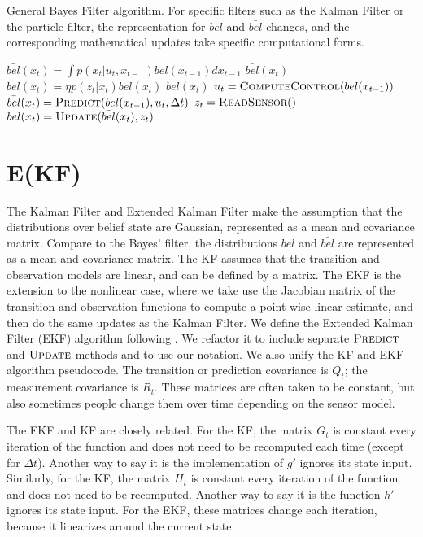 \documentclass{article}
\begin{document}
\begin{algorithm}
  \caption{General Bayes Filter algorithm.  For specific filters such as the Kalman Filter or the particle filter, the representation for $bel$ and $\bar{bel}$ changes, and the corresponding mathematical updates take specific computational forms.}
  \begin{algorithmic}[1]
    \State $\bar{bel}(x_t) = \int p(x_t | u_t, x_{t-1}) bel(x_{t-1}) dx_{t-1}$
    \State \Return $\bar{bel}(x_t)$
    \EndFunction
    \State $bel(x_t) = \eta p(z_t | x_t) bel(x_t)$
    \State \Return $bel(x_t)$    
    \EndFunction
    \State $u_t = \textsc{ComputeControl}(bel(x_{t-1}))$
    \State $\bar{bel}(x_t) = \textsc{Predict}(bel(x_{t-1}), u_t, \Delta t)$
    \State $z_t = \textsc{ReadSensor}()$
    \State $bel(x_t) = \textsc{Update}(\bar{bel}(x_t), z_t)$
    \EndFunction        
    \end{algorithmic}
\end{algorithm}


\section{E(KF)}

The Kalman Filter and Extended Kalman Filter make the assumption that
the distributions over belief state are Gaussian, represented as a
mean and covariance matrix. Compare to the Bayes' filter, the
distributions $bel$ and $\bar{bel}$ are represented as a mean and
covariance matrix.  The KF assumes that the transition and observation
models are linear, and can be defined by a matrix.  The EKF is the
extension to the nonlinear case, where we take use the Jacobian matrix
of the transition and observation functions to compute a point-wise
linear estimate, and then do the same updates as the Kalman Filter.
We define the Extended Kalman Filter (EKF) algorithm following
\citet{thrun2005probabilistic}.  We refactor it to include separate
$\textsc{Predict}$ and $\textsc{Update}$ methods and to use our
notation. We also unify the KF and EKF algorithm pseudocode.  The
transition or prediction covariance is $Q_t$; the measurement
covariance is $R_t$.  These matrices are often taken to be constant,
but also sometimes people change them over time depending on the
sensor model.

The EKF and KF are closely related.  For the KF, the matrix $G_t$ is
constant every iteration of the function and does not need to be
recomputed each time (except for $\Delta t$).  Another way to say it
is the implementation of $g'$ ignores its state input.  Similarly, for
the KF, the matrix $H_t$ is constant every iteration of the function
and does not need to be recomputed.  Another way to say it is the
function $h'$ ignores its state input.  For the EKF, these matrices
change each iteration, because it linearizes around the current
state.
\end{document}
